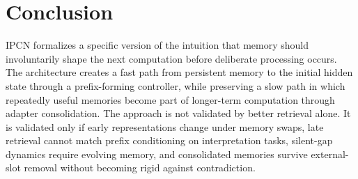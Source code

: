 \documentclass[11pt]{article}
\begin{document}
\section{Conclusion}

IPCN formalizes a specific version of the intuition that memory should involuntarily shape the next computation before deliberate processing occurs. The architecture creates a fast path from persistent memory to the initial hidden state through a prefix-forming controller, while preserving a slow path in which repeatedly useful memories become part of longer-term computation through adapter consolidation. The approach is not validated by better retrieval alone. It is validated only if early representations change under memory swaps, late retrieval cannot match prefix conditioning on interpretation tasks, silent-gap dynamics require evolving memory, and consolidated memories survive external-slot removal without becoming rigid against contradiction.
\end{document}
